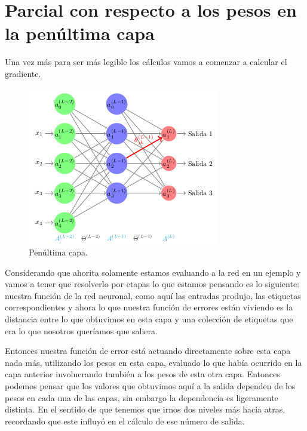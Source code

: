 \section{Parcial con respecto a los pesos en la penúltima capa}


Una vez más para ser más legible los cálculos vamos a comenzar a calcular el gradiente.

\begin{figure}[H]
 \centering
 \includegraphics[scale=0.5]{../Figuras/AredNa.png}
 \caption{Penúltima capa.}
 \label{fig:graficaLog}
\end{figure}

Considerando que ahorita solamente estamos evaluando a la red en un ejemplo y vamos a tener que resolverlo por etapas lo que estamos pensando es lo siguiente: nuestra función de la red neuronal, como aquí las entradas produjo, las etiquetas correspondientes y ahora lo que nuestra función de errores están viviendo es la distancia entre lo que obtuvimos en esta capa y una colección de etiquetas que era lo que nosotros queríamos que saliera. 

Entonces nuestra función de error está actuando directamente sobre esta capa nada más,  utilizando los pesos en esta capa, evaluado lo que había ocurrido en la capa anterior involucrando también a los pesos de esta otra capa. Entonces podemos pensar que los valores que obtuvimos aquí a la salida dependen de los pesos en cada una de las capas, sin embargo la dependencia es ligeramente distinta. En el sentido de que tenemos que irnos dos niveles más hacia atras, recordando que este influyó en el cálculo de ese número de salida.

